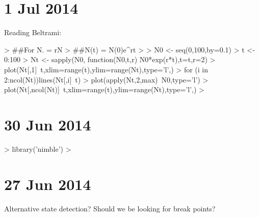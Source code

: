 \documentclass[12pt]{article}
\begin{document}
\section{1 Jul 2014}

Reading Beltrami:

\begin{Schunk}
\begin{Sinput}
> ##For N. = rN
> ##N(t) = N(0)e^rt
> 
> N0 <- seq(0,100,by=0.1)
> t <- 0:100
> Nt <- sapply(N0, function(N0,t,r) N0*exp(r*t),t=t,r=2)
> plot(Nt[,1]~t,xlim=range(t),ylim=range(Nt),type='l',)
> for (i in 2:ncol(Nt)){lines(Nt[,i]~t)}
> plot(apply(Nt,2,max)~N0,type='l')
> plot(Nt[,ncol(Nt)]~t,xlim=range(t),ylim=range(Nt),type='l',)
> 
\end{Sinput}
\end{Schunk}

\section{30 Jun 2014}



\begin{Schunk}
\begin{Sinput}
>   library('nimble')
> 
\end{Sinput}
\end{Schunk}

\section{27 Jun 2014}
Alternative state detection?
Should we be looking for break points?
\end{document}
